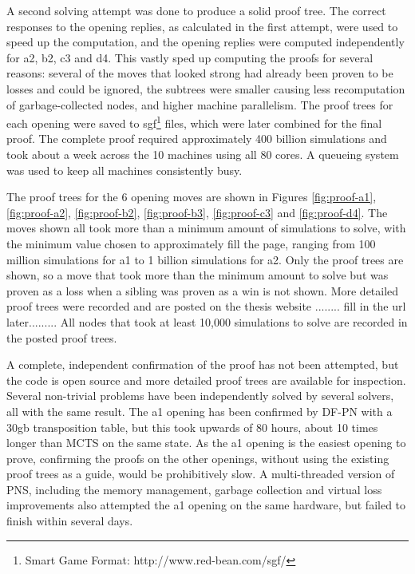 A second solving attempt was done to produce a solid proof tree. The correct responses to the opening replies, as calculated in the first attempt, were used to speed up the computation, and the opening replies were computed independently for a2, b2, c3 and d4. This vastly sped up computing the proofs for several reasons: several of the moves that looked strong had already been proven to be losses and could be ignored, the subtrees were smaller causing less recomputation of garbage-collected nodes, and higher machine parallelism. The proof trees for each opening were saved to sgf\footnote{Smart Game Format: http://www.red-bean.com/sgf/} files, which were later combined for the final proof. The complete proof required approximately 400 billion simulations and took about a week across the 10 machines using all 80 cores. A queueing system was used to keep all machines consistently busy.

The proof trees for the 6 opening moves are shown in Figures \ref{fig:proof-a1}, \ref{fig:proof-a2}, \ref{fig:proof-b2}, \ref{fig:proof-b3}, \ref{fig:proof-c3} and \ref{fig:proof-d4}. The moves shown all took more than a minimum amount of simulations to solve, with the minimum value chosen to approximately fill the page, ranging from 100 million simulations for a1 to 1 billion simulations for a2. Only the proof trees are shown, so a move that took more than the minimum amount to solve but was proven as a loss when a sibling was proven as a win is not shown. More detailed proof trees were recorded and are posted on the thesis website ........ fill in the url later......... All nodes that took at least 10,000 simulations to solve are recorded in the posted proof trees.

A complete, independent confirmation of the proof has not been attempted, but the code is open source and more detailed proof trees are available for inspection. Several non-trivial problems have been independently solved by several solvers, all with the same result. The a1 opening has been confirmed by DF-PN with a 30gb transposition table, but this took upwards of 80 hours, about 10 times longer than MCTS on the same state. As the a1 opening is the easiest opening to prove, confirming the proofs on the other openings, without using the existing proof trees as a guide, would be prohibitively slow. A multi-threaded version of PNS, including the memory management, garbage collection and virtual loss improvements also attempted the a1 opening on the same hardware, but failed to finish within several days.

